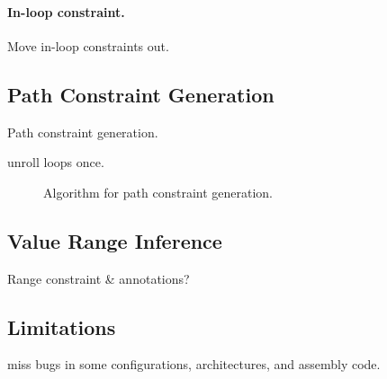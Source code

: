 \paragraph{In-loop constraint.}
Move in-loop constraints out.

\subsection{Path Constraint Generation}

Path constraint generation.

unroll loops once.

\begin{figure}
\footnotesize

\caption{Algorithm for path constraint generation.}
\label{f:path-cstr}
\end{figure}

\subsection{Value Range Inference}

Range constraint \& annotations?

\subsection{Limitations}

miss bugs in some configurations, architectures,
and assembly code.
